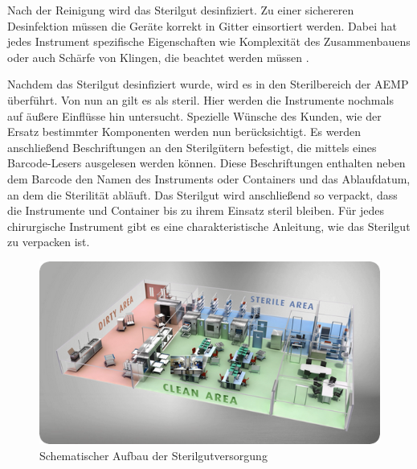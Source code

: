 Nach der Reinigung wird das Sterilgut desinfiziert. Zu einer sichereren Desinfektion müssen die Geräte korrekt in Gitter einsortiert werden. Dabei hat jedes Instrument spezifische Eigenschaften wie Komplexität des Zusammenbauens oder auch Schärfe von Klingen, die beachtet werden müssen \cite[S.~11]{Ruther2014}.

Nachdem das Sterilgut desinfiziert wurde, wird es in den Sterilbereich der AEMP überführt. Von nun an gilt es als steril. Hier werden die Instrumente nochmals auf äußere Einflüsse hin untersucht. Spezielle Wünsche des Kunden, wie der Ersatz bestimmter Komponenten werden nun berücksichtigt. Es werden anschließend Beschriftungen an den Sterilgütern befestigt, die mittels eines Barcode-Lesers ausgelesen werden können. Diese Beschriftungen enthalten neben dem Barcode den Namen des Instruments oder Containers und das Ablaufdatum, an dem die Sterilität abläuft. Das Sterilgut wird anschließend so verpackt, dass die Instrumente und Container bis zu ihrem Einsatz steril bleiben. Für jedes chirurgische Instrument gibt es eine charakteristische Anleitung, wie das Sterilgut zu verpacken ist.

\begin{figure}[htbp]
    \centering
    \includegraphics[width=1\textwidth]{data/bilder/clean-area-sterile-area.png}
    \caption{Schematischer Aufbau der Sterilgutversorgung \cite{Ives2017}}
    \label{fig:AufbauDerSterilgutversorgung}
\end{figure}

